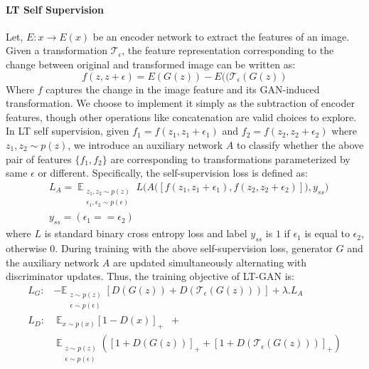 \documentclass[10pt,twocolumn,letterpaper]{article}
\begin{document}
\paragraph{LT Self Supervision} 
Let, $E: x \rightarrow E(x)$ be an encoder network to extract the features of an image. Given a transformation $\mathcal{T_{\epsilon}}$, the feature representation corresponding to the change between original and transformed image can be written as:
\begin{equation}
f(z,z+\epsilon) = E(G(z)) -  E((\mathcal{T_{\epsilon}}(G(z))
\end{equation}\label{eq:change_in_t}
Where $f$ captures the change in the image feature and its GAN-induced transformation. We choose to implement it simply as the subtraction of encoder features, though other operations like concatenation are valid choices to explore. In LT self supervision, given $f_1 = f(z_1, z_1 + \epsilon_1)$ and $f_2 = f(z_2, z_2 + \epsilon_2)$ where $z_1 , z_2 \sim p(z)$, we introduce an auxiliary network $A$ to classify whether the above pair of features $\{f_1,f_2\}$ are corresponding to transformations parameterized by same $\epsilon$ or different. Specifically, the self-supervision loss is defined as: 
\begin{equation}
\begin{aligned}
        & L_{A} = \mathop{\mathbb{E}}_{\substack{z_1 , z_2 \sim p(z) \\ \epsilon_1,\epsilon_2 \sim p(\epsilon)}} L \Big( A\big([ f(z_1, z_1 + \epsilon_1) , f(z_2, z_2 + \epsilon_2) ]\big) , y_{ss} \Big)\\
        &  y_{ss} = (\epsilon_1 == \epsilon_2) 
\end{aligned}
\end{equation}
\noindent where $L$ is standard binary cross entropy loss and label $y_{ss}$ is $1$ if $\epsilon_1$ is equal to $\epsilon_2$, otherwise $0$. During training with the above self-supervision loss, generator $G$ and the auxiliary network $A$ are updated simultaneously alternating with discriminator updates. Thus, the training objective of LT-GAN is: 
\begin{equation}
    \begin{aligned}
    L_G : &  -\mathbb{E}_{\substack{ z \sim p(z) \\ \epsilon \sim p(\epsilon)} } [D(G(z)) + D(\mathcal{T_{\epsilon}}(G(z))) ] + \lambda . L_A \\
    L_D : & \;\mathbb{E}_{x  \sim p(x) } [1 - D(x) ]_{+} \; \; + \\ & \; \mathbb{E}_{ \substack{ z \sim p(z) \\ \epsilon \sim p(\epsilon) } } ( [1 + D(G(z)) ]_{+} + [1 + D(\mathcal{T_{\epsilon}}(G(z))) ]_{+} ) \\
\end{aligned}\label{eq:lt-loss}
\end{equation}
\end{document}
